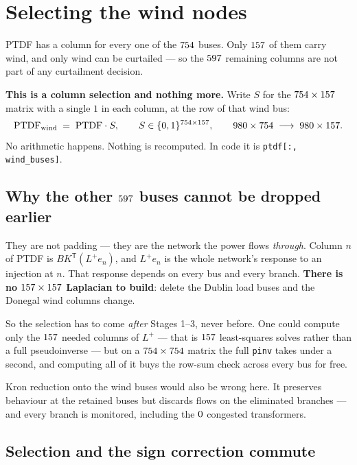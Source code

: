 \documentclass[11pt,a4paper]{article}
\newcommand{\T}{^{\mathsf{T}}}
\newcommand{\Lp}{L^{+}}
\newcommand{\note}[1]{{\color{soft}\small #1}}
\begin{document}
\newpage
\section{Selecting the wind nodes}

PTDF has a column for every one of the $754$ buses. Only $157$ of them
carry wind, and only wind can be curtailed --- so the $597$ remaining
columns are not part of any curtailment decision.

\textbf{This is a column selection and nothing more.} Write $S$ for the
$754 \times 157$ matrix with a single $1$ in each column, at the row of
that wind bus:
\begin{equation}
  \text{PTDF}_{\text{wind}} \;=\; \text{PTDF} \cdot S,
  \qquad
  S \in \{0,1\}^{754 \times 157},
  \qquad
  980 \times 754 \;\longrightarrow\; 980 \times 157 .
\end{equation}
No arithmetic happens. Nothing is recomputed. In code it is
\texttt{ptdf[:, wind\_buses]}.

\subsection*{Why the other \texorpdfstring{$597$}{597} buses cannot be dropped earlier}

They are not padding --- they are the network the power flows \emph{through}.
Column $n$ of PTDF is $B K\T (\Lp e_n)$, and $\Lp e_n$ is the whole network's
response to an injection at $n$. That response depends on every bus and every
branch. \textbf{There is no $157 \times 157$ Laplacian to build}:
delete the Dublin load buses and the Donegal wind columns change.

\medskip
So the selection has to come \emph{after} Stages 1--3, never before. One could
compute only the $157$ needed columns of $\Lp$ --- that is $157$
least-squares solves rather than a full pseudoinverse --- but on a
$754 \times 754$ matrix the full \texttt{pinv} takes under a second, and
computing all of it buys the row-sum check across every bus for free.

\note{Kron reduction onto the wind buses would also be wrong here. It preserves
behaviour at the retained buses but discards flows on the eliminated branches
--- and every branch is monitored, including the $0$ congested
transformers.}

\subsection*{Selection and the sign correction commute}
\end{document}
